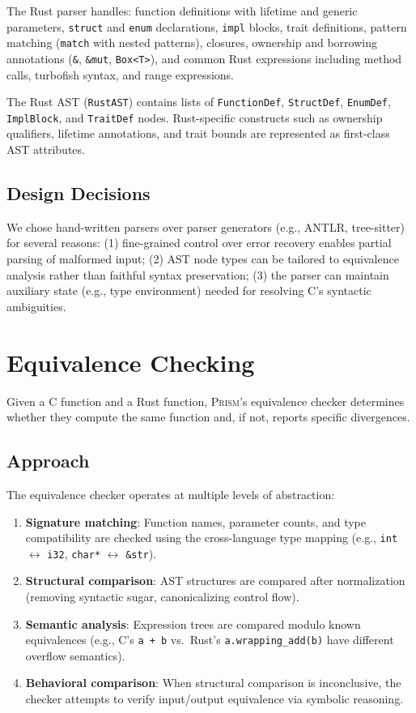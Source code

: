 \documentclass[11pt,a4paper]{article}
\begin{document}
The Rust parser handles: function definitions with lifetime and generic
parameters, \texttt{struct} and \texttt{enum} declarations,
\texttt{impl} blocks, trait definitions, pattern matching
(\texttt{match} with nested patterns), closures, ownership and
borrowing annotations (\texttt{\&}, \texttt{\&mut}, \texttt{Box<T>}),
and common Rust expressions including method calls, turbofish syntax,
and range expressions.

The Rust AST (\texttt{RustAST}) contains lists of \texttt{FunctionDef},
\texttt{StructDef}, \texttt{EnumDef}, \texttt{ImplBlock}, and
\texttt{TraitDef} nodes. Rust-specific constructs such as ownership
qualifiers, lifetime annotations, and trait bounds are represented
as first-class AST attributes.

\subsection{Design Decisions}

We chose hand-written parsers over parser generators (e.g., ANTLR,
tree-sitter) for several reasons:
(1) fine-grained control over error recovery enables partial parsing
of malformed input;
(2) AST node types can be tailored to equivalence analysis rather
than faithful syntax preservation;
(3) the parser can maintain auxiliary state (e.g., type environment)
needed for resolving C's syntactic ambiguities.


\section{Equivalence Checking}\label{sec:equivalence}

Given a C function and a Rust function, \textsc{Prism}'s equivalence
checker determines whether they compute the same function and, if not,
reports specific divergences.

\subsection{Approach}

The equivalence checker operates at multiple levels of abstraction:

\begin{enumerate}
  \item \textbf{Signature matching}: Function names, parameter counts,
    and type compatibility are checked using the cross-language type
    mapping (e.g., \texttt{int} $\leftrightarrow$ \texttt{i32},
    \texttt{char*} $\leftrightarrow$ \texttt{\&str}).
  \item \textbf{Structural comparison}: AST structures are compared
    after normalization (removing syntactic sugar, canonicalizing
    control flow).
  \item \textbf{Semantic analysis}: Expression trees are compared
    modulo known equivalences (e.g., C's \texttt{a + b} vs.\ Rust's
    \texttt{a.wrapping\_add(b)} have different overflow semantics).
  \item \textbf{Behavioral comparison}: When structural comparison is
    inconclusive, the checker attempts to verify input/output
    equivalence via symbolic reasoning.
\end{enumerate}
\end{document}

